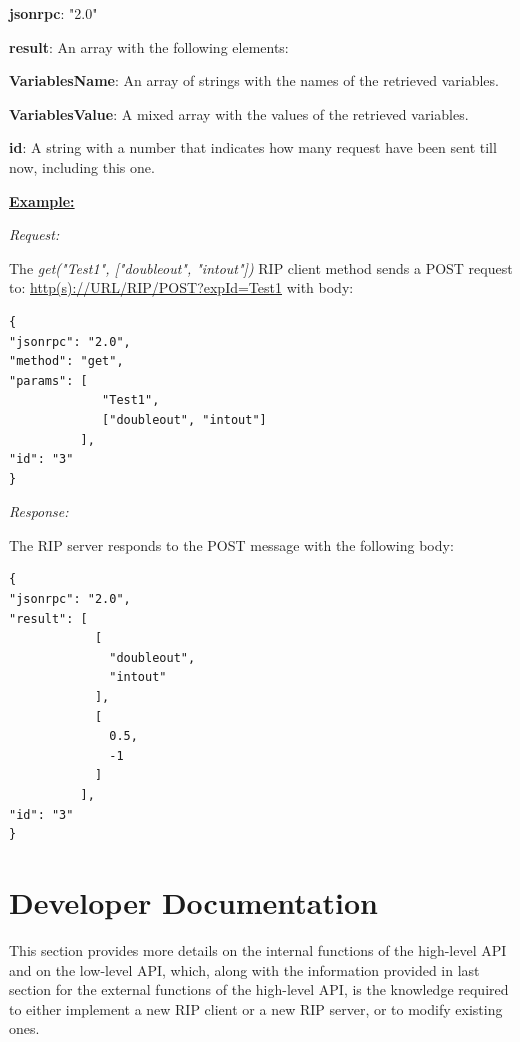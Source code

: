 \begin{myEnumerate}
    \item \textbf{jsonrpc}: "2.0"
    \item \textbf{result}: An array with the following elements:
    \begin{myEnumerate}
        \item \textbf{VariablesName}: An array of strings with the names of the retrieved variables.
        \item \textbf{VariablesValue}: A mixed array with the values of the retrieved variables.
    \end{myEnumerate}
    \item \textbf{id}: A string with a number that indicates how many request have been sent till now, including this one.
\end{myEnumerate}

\textbf{\underline{Example:}}

\textit{Request:}

The \textit{get("Test1", ["doubleout", "intout"])} RIP client method sends a POST request to: \url{http(s)://URL/RIP/POST?expId=Test1} with body:

\begin{lstlisting}
{
"jsonrpc": "2.0",
"method": "get",
"params": [
  	         "Test1",
  	         ["doubleout", "intout"]
          ],
"id": "3"
}
\end{lstlisting}

\textit{Response:}

The RIP server responds to the POST message with the following body:

\begin{lstlisting}
{
"jsonrpc": "2.0",
"result": [
            [
              "doubleout",
              "intout"
            ],
            [
              0.5,
              -1
            ]
          ],
"id": "3"
}
\end{lstlisting}

\section{Developer Documentation}
\label{sec:Developer_Doc}
This section provides more details on the internal functions of the high-level API and on the low-level API, which, along with the information provided in last section for the external functions of the high-level API, is the knowledge required to either implement a new RIP client or a new RIP server, or to modify existing ones.

